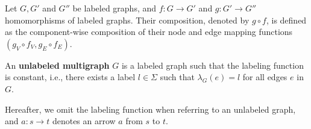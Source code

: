 \begin{definition}
    \label{def:graph:composition}
    Let $G, G'$ and $G''$ be labeled graphs, and $f: G \mathop{\to} G'$ and $g: G' \mathop{\to} G''$ homomorphisms of labeled graphs. Their composition, denoted by $g \circ f$, is defined as the component-wise composition of their node and edge mapping functions $(g_V \circ f_V, g_E \circ f_E)$.
\end{definition}

\begin{definition}
    \label{def:graph:unlabeled}
    An \textbf{unlabeled multigraph} \( G \) is a labeled graph such that the labeling function is constant, i.e., there exists a label \( l \mathop{\in} \Sigma \) such that \( \lambda_G(e) \mathop{=} l \) for all edges \( e \) in $G$.
\end{definition}
    Hereafter, we omit the labeling function when referring to an unlabeled graph, and \( a: s \mathop{\to} t \) denotes an arrow \( a \) from \( s \) to \( t \).